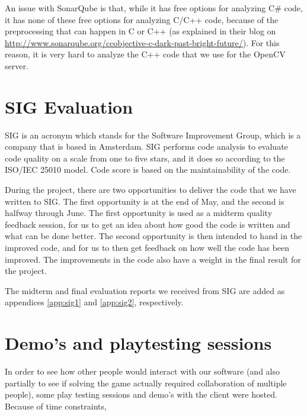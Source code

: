 		An issue with SonarQube is that, while it has free options for analyzing
		C\# code, it has none of these free options for analyzing C/C++ code,
		because of the preprocessing that can happen in C or C++ (as explained
		in their blog on \url{http://www.sonarqube.org/ccobjective-c-dark-past-bright-future/}).
		For this reason, it is very hard to analyze the C++ code that we use for the
		OpenCV server.
		
	\section{SIG Evaluation} \label{sec:sigevaluation}
		SIG is an acronym which stands for the Software Improvement Group,
		which is a company that is based in Amsterdam. SIG performs code
		analysis to evaluate code quality on a scale from one to five stars,
		and it does so according to the ISO/IEC 25010 model. Code score is 
		based on the maintainability of the code.
		
		During the project, there are two opportunities to deliver the code 
		that we have written to SIG. The first opportunity is at the end of 
		May, and the second is halfway through June. The first opportunity 
		is used as a midterm quality feedback session, for us to get an idea 
		about how good the code is written and what can be done better. The 
		second opportunity is then intended to hand in the improved code, 
		and for us to then get feedback on how well the code has been improved. 
		The improvements in the code also have a weight in the final result 
		for the project.
		
		The midterm and final evaluation reports we received from SIG are added
		as appendices \ref{app:sig1} and \ref{app:sig2}, respectively.
		
	\section{Demo's and playtesting sessions} \label{sec:demos}
		In order to see how other people would interact with our software (and
		also partially to see if solving the game actually required collaboration
		of multiple people), some play testing sessions and demo's with the
		client were hosted. Because of time constraints, 
